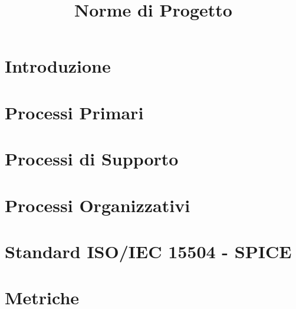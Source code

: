 \documentclass{classes/base}
\title{Norme di Progetto}
\author{\matteo}
\begin{document}
	\maketitle
	\newpage
	
	\newpage
	\tableofcontents
	\newpage
	\listoftables

	\newpage
	\section{Introduzione}
	
	
	\newpage
	\section{Processi Primari}
	
	
	\newpage
	\section{Processi di Supporto}
	
	
	\newpage
	\section{Processi Organizzativi}
	
	
	\newpage
	\section{Standard ISO/IEC 15504 - SPICE}
	

	\newpage
	\section{Metriche}
	
	
\end{document}
